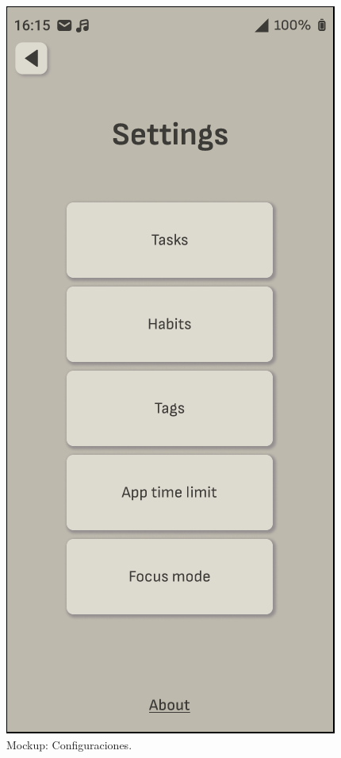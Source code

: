 \begin{figure}[H]
\begin{minipage}{0.48\textwidth}
    \centering
  \end{minipage}\hfill
  \begin{minipage}{0.48\textwidth}
    \caption{Mockup: Configuraciones.}
    \label{fig:mockup_configuraciones}
    \includegraphics[width=\textwidth]{Figuras/mockup_4.png}
    \centering
  \end{minipage}
\end{figure}